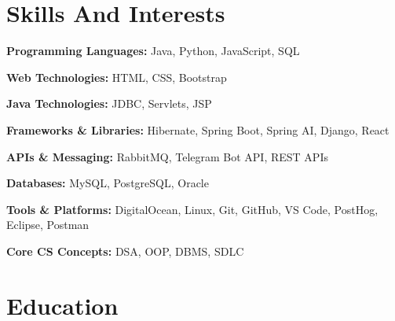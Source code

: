 \documentclass[a4paper,11pt]{article}
\begin{document}

\section{\textbf{Skills And Interests}}

\noindent
\textbf{Programming Languages: }{Java, Python, JavaScript, SQL}

\vspace{1.5pt}

\noindent
\textbf{Web Technologies: }{HTML, CSS, Bootstrap}

\vspace{1.5pt}

\noindent
\textbf{Java Technologies: }{JDBC, Servlets, JSP}

\vspace{1.5pt}

\noindent
\textbf{Frameworks \& Libraries: }{Hibernate, Spring Boot, Spring AI, Django, React}

\vspace{1.5pt}

\noindent
\textbf{APIs \& Messaging: }{RabbitMQ, Telegram Bot API, REST APIs}

\vspace{1.5pt}

\noindent
\textbf{Databases: }{MySQL, PostgreSQL, Oracle}

\vspace{1.5pt}

\noindent
\textbf{Tools \& Platforms: }{DigitalOcean, Linux, Git, GitHub, VS Code, PostHog, Eclipse, Postman}

\vspace{1.5pt}

\noindent
\textbf{Core CS Concepts: }{DSA, OOP, DBMS, SDLC}


\section{\textbf{Education}}
\end{document}
